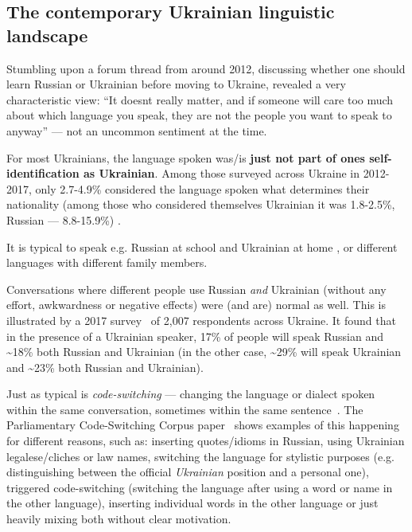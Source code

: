 \subsection{The contemporary Ukrainian linguistic
landscape}\label{the-contemporary-ukrainian-linguistic-landscape}

Stumbling upon a forum thread from around 2012, discussing whether one should learn Russian or Ukrainian before moving to Ukraine, revealed a very characteristic view:
``It doesn\textquotesingle t
really matter, and if someone will care too much about which language
you speak, they are not the people you want to speak to anyway'' --- not
an uncommon sentiment at the time.

For most Ukrainians, the language spoken was/is \textbf{just not part of
one\textquotesingle s self-identification as Ukrainian}. Among those
surveyed across Ukraine in 2012-2017, only 2.7-4.9\% considered the
language spoken what determines their nationality (among those who
considered themselves Ukrainian it was 1.8-2.5\%, Russian ---
8.8-15.9\%) \cite{kulyk2018shedding}.

It is typical to speak e.g. Russian at school and Ukrainian at home
\cite{Racek2024}, or different languages with different family members.%

Conversations where different people use Russian \textit{and} Ukrainian (without
any effort, awkwardness or negative effects) were (and are) normal as
well. This is illustrated by a 2017 survey~\cite{Matveyeva2017} of 2,007
respondents across Ukraine. It found that in the presence of a Ukrainian
speaker, 17\% of people will speak Russian and \textasciitilde18\% both
Russian and Ukrainian (in the other case, \textasciitilde29\% will speak
Ukrainian and \textasciitilde23\% both Russian and Ukrainian).

Just as typical is \emph{code-switching} --- changing the language or
dialect spoken within the same conversation, sometimes within the same
sentence~\cite{Kanishcheva2023}. The Parliamentary Code-Switching
Corpus paper~\cite{Kanishcheva2023} shows examples of this happening for
different reasons, such as: inserting quotes/idioms in Russian, using
Ukrainian legalese/cliches or law names, switching the language for
stylistic purposes (e.g. distinguishing between the official
\emph{Ukrainian} position and a personal one), triggered code-switching
(switching the language after using a word or name in the other
language), inserting individual words in the other language or just
heavily mixing both without clear motivation.

